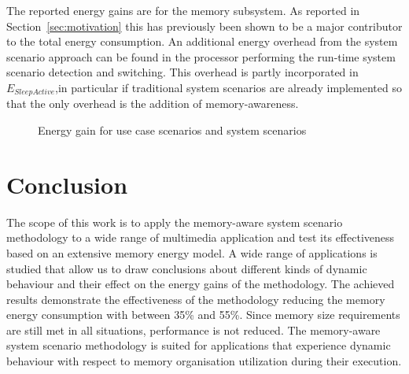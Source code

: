 \documentclass{acm_proc_article-sp}
\begin{document}
The reported energy gains are for the memory subsystem. As reported in Section~\ref{sec:motivation} this has previously been shown to be a major contributor to the total energy consumption. An additional energy overhead from the system scenario approach can be found in the processor performing the run-time system scenario detection and switching. This overhead is partly incorporated in $E_{SleepActive}$,in particular if traditional system scenarios are already implemented so that the only overhead is the addition of memory-awareness.

\begin{figure}[!t]
\centering
\caption{Energy gain for use case scenarios and system scenarios}
\label{fig:usecase}
\end{figure}

\section{Conclusion}
\label{sec:conclusion}

The scope of this work is to apply the memory-aware system scenario methodology to a wide range of multimedia application and test its effectiveness based on an extensive memory energy model. A wide range of applications is studied that allow us to draw conclusions about different kinds of dynamic behaviour and their effect on the energy gains of the methodology. The achieved results demonstrate the effectiveness of the methodology reducing the memory energy consumption with between 35\% and 55\%. Since memory size requirements are still met in all situations, performance is not reduced. The memory-aware system scenario methodology is suited for applications that experience dynamic behaviour with respect to memory organisation utilization during their execution.


%


\end{document}
